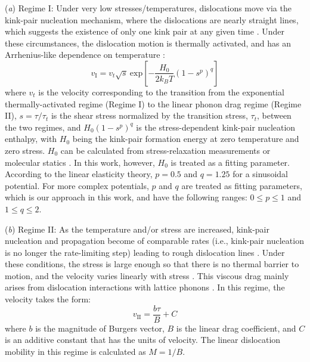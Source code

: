 \documentclass[applsci,article,submit,pdftex,moreauthors]{Definitions/mdpi}
\newcommand{\?}{\stackrel{?}{=}}
\begin{document}
(\textit{a}) Regime I: Under very low stresses/temperatures, dislocations move via the kink-pair nucleation mechanism, where the dislocations are nearly straight lines, which suggests the existence of only one kink pair at any given time \cite{Gilbert2011}. Under these circumstances, the dislocation motion is thermally activated, and has an Arrhenius-like dependence on temperature \cite{Gilbert2011, Starikov2020}:
\begin{equation}
v_\text{I} = v_t \sqrt{s} \ \mathrm{exp} \left[ - \frac{H_0}{2 k_B T} \left(1-s^p\right)^q \right]
\label{Eq:MobI}
\end{equation}
where $v_t$ is the velocity corresponding to the transition from the exponential thermally-activated regime (Regime I) to the linear phonon drag regime (Regime II), $s = \tau/\tau_t$ is the shear stress normalized by the transition stress, $\tau_t$, between the two regimes, and $H_0 \left(1-s^p\right)^q$ is the stress-dependent kink-pair nucleation enthalpy, with $H_0$ being the kink-pair formation energy at zero temperature and zero stress. $H_0$ can be calculated from stress-relaxation measurements or molecular statics \cite{Ventelon2009, Gilbert2011}. In this work, however, $H_0$ is treated as a fitting parameter. According to the linear elasticity theory, $p=0.5$ and $q=1.25$ for a sinusoidal potential. For more complex potentials, $p$ and $q$ are treated as fitting parameters, which is our approach in this work, and have the following ranges: $0 \leq p \leq 1$ and $1 \leq q \leq 2$.

(\textit{b}) Regime II: As the temperature and/or stress are increased, kink-pair nucleation and propagation become of comparable rates (i.e., kink-pair nucleation is no longer the rate-limiting step) leading to rough dislocation lines \cite{Gilbert2011}. Under these conditions, the stress is large enough so that there is no thermal barrier to motion, and the velocity varies linearly with stress \cite{Dang2019, Olmsted2005}. This viscous drag mainly arises from dislocation interactions with lattice phonons \cite{Dang2019}. In this regime, the velocity takes the form:
\begin{equation}
v_\text{II} = \frac{b \tau}{B} + C
\label{Eq:MobII}
\end{equation}
where $b$ is the magnitude of Burgers vector, $B$ is the linear drag coefficient, and $C$ is an additive constant that has the units of velocity. The linear dislocation mobility in this regime is calculated as $M = 1/B$.
\end{document}
